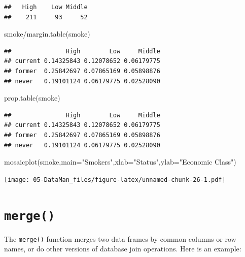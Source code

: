 \documentclass[
]{book}
\newenvironment{Shaded}{\begin{snugshade}}{\end{snugshade}}
\newcommand{\AttributeTok}[1]{\textcolor[rgb]{0.77,0.63,0.00}{#1}}
\newcommand{\FunctionTok}[1]{\textcolor[rgb]{0.00,0.00,0.00}{#1}}
\newcommand{\NormalTok}[1]{#1}
\newcommand{\SpecialCharTok}[1]{\textcolor[rgb]{0.00,0.00,0.00}{#1}}
\newcommand{\StringTok}[1]{\textcolor[rgb]{0.31,0.60,0.02}{#1}}
\begin{document}
\begin{verbatim}
##   High    Low Middle 
##    211     93     52
\end{verbatim}

\begin{Shaded}
\begin{Highlighting}[]
\NormalTok{smoke}\SpecialCharTok{/}\FunctionTok{margin.table}\NormalTok{(smoke)}
\end{Highlighting}
\end{Shaded}

\begin{verbatim}
##               High        Low     Middle
## current 0.14325843 0.12078652 0.06179775
## former  0.25842697 0.07865169 0.05898876
## never   0.19101124 0.06179775 0.02528090
\end{verbatim}

\begin{Shaded}
\begin{Highlighting}[]
\FunctionTok{prop.table}\NormalTok{(smoke)}
\end{Highlighting}
\end{Shaded}

\begin{verbatim}
##               High        Low     Middle
## current 0.14325843 0.12078652 0.06179775
## former  0.25842697 0.07865169 0.05898876
## never   0.19101124 0.06179775 0.02528090
\end{verbatim}

\begin{Shaded}
\begin{Highlighting}[]
\FunctionTok{mosaicplot}\NormalTok{(smoke,}\AttributeTok{main=}\StringTok{"Smokers"}\NormalTok{,}\AttributeTok{xlab=}\StringTok{"Status"}\NormalTok{,}\AttributeTok{ylab=}\StringTok{"Economic Class"}\NormalTok{)}
\end{Highlighting}
\end{Shaded}

\texttt{[image: 05-DataMan\_files/figure-latex/unnamed-chunk-26-1.pdf]}

\hypertarget{merge}{%
\section{\texorpdfstring{\texttt{merge()}}{merge()}}\label{merge}}

The \texttt{merge()} function merges two data frames by common columns or row names, or do other versions of database join operations. Here is an example:
\end{document}
